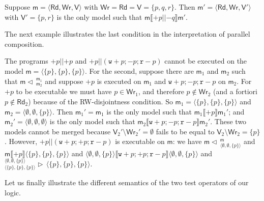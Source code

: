 \documentclass{llncs}
\newcommand{\modl}{\mathsf m}
\newcommand{\mrg}[3]{ ^{#2}_{#3} \triangleright \, #1 }
\newcommand{\pll}{ {||} }							%
\newcommand{\splt}[3]{ #1 \triangleleft \, ^{#2}_{#3} }
\newcommand{\readset}{\mathsf{Rd}}
\newcommand{\valuset}{\mathsf{V}}
\newcommand{\writeset}{\mathsf{Wr}}
\newcommand{\testendo}{?\!\!?}			%
\newcommand{\testpdl}{?}				%
\newcommand{\assgnbotR}[1]{{\mathtt r {-} #1}}
\newcommand{\assgntopW}[1]{{\mathtt w {+} #1}}
\newcommand{\assgnbotW}[1]{{\mathtt w {-} #1}}
\newcommand{\assgntopV}[1]{{\mathtt {+} #1}}
\newcommand{\assgnbotV}[1]{{\mathtt {-} #1}}
\newcommand{\intPgm}[1]{\llbracket #1 \rrbracket}
\renewcommand{\phi}{\varphi}
\newcommand{\tuple}[1]{ \langle #1 \rangle}
\begin{document}
\begin{example}
Suppose  
$\modl = \tuple{\readset,\writeset,\valuset}$ with $\writeset = \readset = \valuset = \{ p, q, r \}$. Then
$\modl' = \tuple{\readset,\writeset,\valuset'}$ with $\valuset' = \{ p, r\}$ is the only model such that 
$\modl \intPgm{  \assgntopV{p} \pll \assgnbotV{q} } \modl' $. 
\end{example}

The next example illustrates the last condition in the interpretation of parallel composition.

\begin{example}
The programs 
$\assgntopV p \pll \assgntopV p $ and
$\assgntopV p \pll (\assgntopW p ; \assgnbotV p ; \assgnbotR p ) $
cannot be executed on the model $\modl = \tuple{ \{p\}, \{p\}, \{p\} }$. 
For the second, suppose there are $\modl_1$ and $\modl_2$ such that $\splt{\modl}{\modl_1} {\modl_2}$ and 
suppose $\assgntopV p$ is executed on $\modl_1$ and 
$\assgntopW p ; \assgnbotV p ; \assgnbotR p$ on $\modl_2$.
For $\assgntopV p$ to be executable we must have $p \in \writeset_1$, and therefore
$p \notin \writeset_2$ (and a fortiori $p \notin \readset_2$) because of the RW-disjointness condition. 
So $\modl_1 = \tuple{ \{p\}, \{p\}, \{p\} }$ and $\modl_2 = \tuple{ \emptyset, \emptyset, \{p\} }$.
Then 
$\modl_1' = \modl_1$ is the only model such that $\modl_1 \intPgm{ \assgntopV p } \modl_1' $; and 
$\modl_2' = \tuple{ \emptyset, \emptyset, \emptyset }$ is the only model such that $\modl_2 \intPgm{ \assgntopW p ; \assgnbotV p ; \assgnbotR p } \modl_2' $.
These two models cannot be merged because 
$\valuset_2' \setminus \writeset_2' %
= \emptyset$ 
fails to be equal to 
$\valuset_2 \setminus \writeset_2 = \{p\}$. 
%
However, $\assgntopV p \pll ( \assgntopW p ; \assgntopV p ; \assgnbotR p )$
is executable on $\modl$: we have
$\splt{\modl}{\modl}{\tuple{\emptyset,\emptyset,\{p\}}}$ and 
$\modl \intPgm{\assgntopV p} \tuple{\{p\},\{p\},\{p\}}$ and
$\tuple{\emptyset,\emptyset,\{p\}} \intPgm{ \assgntopW p ; \assgntopV p ; \assgnbotR p } \tuple{\emptyset,\emptyset,\{p\} } $ and
$\mrg
{ \tuple{\{p\},\{p\},\{p\}} }
{ \tuple{\emptyset,\emptyset,\{p\}} }
{ \tuple{\{p\},\{p\},\{p\}} }$.
\end{example}

Let us finally illustrate the different semantics of the two test operators of our logic.
\end{document}
